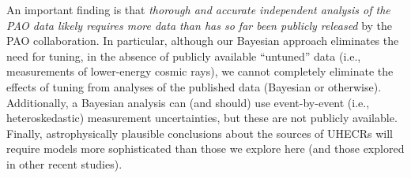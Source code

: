 An important finding is that {\em thorough and accurate independent analysis
of the PAO data likely requires more data than has so far been publicly
released} by the PAO collaboration.  In particular, although our Bayesian
approach eliminates the need for tuning, in the absence of publicly available
``untuned'' data (i.e., measurements of lower-energy cosmic rays), we cannot
completely eliminate the effects of tuning from analyses of the
published data (Bayesian or otherwise).  Additionally, a Bayesian analysis can
(and should) use event-by-event (i.e., heteroskedastic) measurement
uncertainties, but these are not publicly available.  Finally, astrophysically
plausible conclusions about the sources of UHECRs will require models more
sophisticated than those we explore here (and those explored in other recent
studies).
